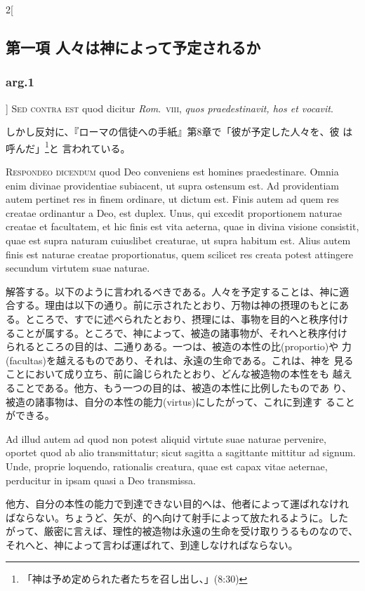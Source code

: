 \documentclass[paper=a4paper,fontsize=10pt,jafontsize=9pt,titlepage]{jlreq}
\begin{document}
\begin{paracol}{2}[\subsection{第一項 人々は神によって予定されるか}\subsubsection{arg.1}]
{\scshape Sed contra est} quod dicitur {\itshape Rom}.~{\scshape viii}, {\itshape quos
praedestinavit, hos et vocavit}.


\switchcolumn


しかし反対に、『ローマの信徒への手紙』第8章で「彼が予定した人々を、彼
は呼んだ」\footnote{「神は予め定められた者たちを召し出し、」(8:30)}と
言われている。




{\scshape Respondeo dicendum} quod Deo conveniens est
homines praedestinare. Omnia enim divinae providentiae subiacent, ut
supra ostensum est. Ad providentiam autem pertinet res in finem
ordinare, ut dictum est. Finis autem ad quem res creatae ordinantur a
Deo, est duplex. Unus, qui excedit proportionem naturae creatae et
facultatem, et hic finis est vita aeterna, quae in divina visione
consistit, quae est supra naturam cuiuslibet creaturae, ut supra habitum
est. Alius autem finis est naturae creatae proportionatus, quem scilicet
res creata potest attingere secundum virtutem suae naturae.


\switchcolumn


解答する。以下のように言われるべきである。人々を予定することは、神に適
合する。理由は以下の通り。前に示されたとおり、万物は神の摂理のもとにあ
る。ところで、すでに述べられたとおり、摂理には、事物を目的へと秩序付け
ることが属する。ところで、神によって、被造の諸事物が、それへと秩序付け
られるところの目的は、二通りある。一つは、被造の本性の比(proportio)や
力(facultas)を越えるものであり、それは、永遠の生命である。これは、神を
見ることにおいて成り立ち、前に論じられたとおり、どんな被造物の本性をも
越えることである。他方、もう一つの目的は、被造の本性に比例したものであ
り、被造の諸事物は、自分の本性の能力(virtus)にしたがって、これに到達す
ることができる。


\switchcolumn*


Ad illud
autem ad quod non potest aliquid virtute suae naturae pervenire, oportet
quod ab alio transmittatur; sicut sagitta a sagittante mittitur ad
signum. Unde, proprie loquendo, rationalis creatura, quae est capax
vitae aeternae, perducitur in ipsam quasi a Deo transmissa.


\switchcolumn


他方、自分の本性の能力で到達できない目的へは、他者によって運ばれなけれ
ばならない。ちょうど、矢が、的へ向けて射手によって放たれるように。した
がって、厳密に言えば、理性的被造物は永遠の生命を受け取りうるものなので、
それへと、神によって言わば運ばれて、到達しなければならない。



\end{paracol}
\end{document}

